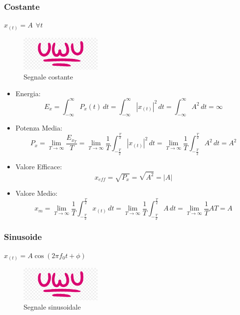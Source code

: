         \subsubsection{Costante}
            $x_{(t)} = A\ \ \forall t$
            \begin{figure}[h]
                \centering
                \includegraphics[width=4cm]{media/uwu.png}
                \caption{Segnale costante}
                \label{fig:segnale costante}
            \end{figure}
            \begin{itemize}
                \item {Energia:
                        \[
                            E_{x} = \int_{-\infty}^{\infty} P_{x}(t) \,dt = \int_{-\infty}^{\infty} |x_{(t)}|^2 \,dt = \int_{-\infty}^{\infty} A^2 \,dt = \infty 
                        \]
                }
                \item {Potenza Media:
                        \[
                            P_{x} = \lim_{T\rightarrow\infty} \frac{E_{x_{T}}}{T} = \lim_{T\rightarrow\infty} \frac{1}{T} \int_{-\frac{T}{2}}^{\frac{T}{2}}  |x_{(t)}|^2 \,dt = \lim_{T\rightarrow\infty} \frac{1}{T} \int_{-\frac{T}{2}}^{\frac{T}{2}} A^2 \,dt = A^2     
                        \]
                }
                \item {Valore Efficace:
                        \[
                            x_{eff} = \sqrt{P_{x}} = \sqrt{A^2} = |A|
                        \]
                }
                \item {Valore Medio:
                        \[
                            x_{m} = \lim_{T\rightarrow\infty} \frac{1}{T} \int_{-\frac{T}{2}}^{\frac{T}{2}}  x_{(t)} \,dt = \lim_{T\rightarrow\infty} \frac{1}{T} \int_{-\frac{T}{2}}^{\frac{T}{2}}  A \,dt = \lim_{T\rightarrow\infty} \frac{1}{T} AT = A 
                        \]
                }
            \end{itemize}
        
        \subsubsection{Sinusoide}
            $x_{(t)} = A \cos(2 \pi f_0 t +\phi)$
            \begin{figure}[H]
                \centering
                \includegraphics[width=4cm]{media/uwu.png}
                \caption{Segnale sinusoidale}
                \label{fig:segnale sinusoidale}
            \end{figure}
            
